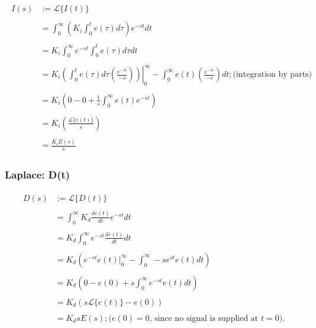 \documentclass[11pt]{article}
\theoremstyle{definition}
\begin{document}
\begin{align*}
    \begin{split}
        I(s) &:= \mathcal{L}\{I(t)\} \\\\
             &= \int_{0}^{\infty}\left(K_{i}\int_{0}^{t}e(\tau)d\tau\right)e^{-st}dt \\\\
             &= K_{i}\int_{0}^{\infty}e^{-st}\int_{0}^{t}e(\tau)d\tau dt \\\\
             &= \left.K_{i}\left(\int_{0}^{t}e(\tau)d\tau \left(\frac{e^{-st}}{-s}\right)\right)\right|_{0}^{\infty} - \int_{0}^{\infty}e(t)\left(\frac{e^{-st}}{-s}\right)dt; \text{(integration by parts)} \\\\
             &= K_{i}\left(0 - 0 + \frac{1}{s}\int_{0}^{\infty}e(t)e^{-st}\right) \\\\
             &= K_{i}\left(\frac{\mathcal{L}\{e(t)\}}{s}\right) \\\\
             &= \frac{K_{i}E(s)}{s} 
    \end{split}
\end{align*}

\subsubsection{Laplace: D(t)}

\begin{align*}
\begin{split}
    D(s) &:= \mathcal{L}\{D(t)\} \\\\
         &= \int_{0}^{\infty}K_{d}\frac{de(t)}{dt}e^{-st}dt \\\\
         &= K_{d} \int_{0}^{\infty}e^{-st}\frac{de(t)}{dt}dt \\\\
         &= K_{d}\left(e^{-st}e(t)\Bigr\rvert_{0}^{\infty} - \int_{0}^{\infty}-se^{st}e(t)dt\right) \\\\
         &= K_{d}\left(0 - e(0) + s \int_{0}^{\infty}e^{-st}e(t)dt\right) \\\\
         &= K_{d}\left(s\mathcal{L}\{e(t)\} - e(0)\right) \\\\
         &= K_{d}sE(s); \text{($e(0) = 0$, since no signal is supplied at $t = 0$).}
\end{split}
\end{align*}
\end{document}
